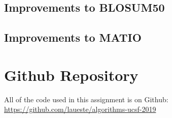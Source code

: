 \documentclass{article}
\begin{document}
\subsection{Improvements to BLOSUM50}

\subsection{Improvements to MATIO}



\section{Github Repository}
All of the code used in this assignment is on Github: \url{https://github.com/laueste/algorithms-ucsf-2019}
\end{document}

